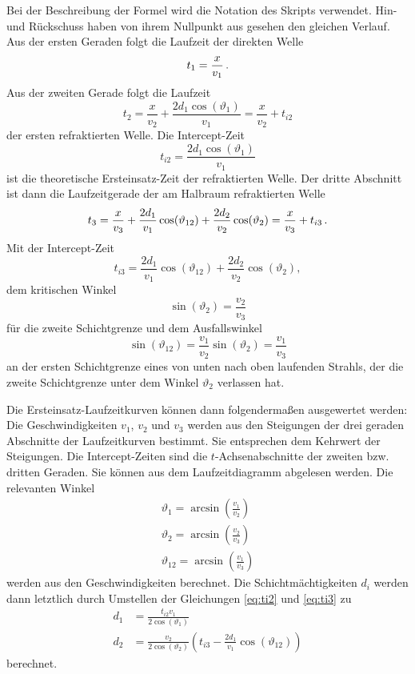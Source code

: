 Bei der Beschreibung der Formel wird die Notation des Skripts \cite{skript} verwendet. Hin- und Rückschuss haben von ihrem Nullpunkt aus gesehen den gleichen Verlauf. Aus der ersten Geraden folgt die Laufzeit der direkten Welle
\begin{equation}
 t_1=\frac{x}{v_1} \text{\,.}
\end{equation}
Aus der zweiten Gerade folgt die Laufzeit
\begin{equation}
 t_2=\frac{x}{v_2}+\frac{2d_1\cos(\vartheta_1)}{v_1}=\frac{x}{v_2}+t_{i2}
\end{equation}
der ersten refraktierten Welle. Die Intercept-Zeit
\begin{equation}
\label{eq:ti2}
 t_{i2}=\frac{2d_1\cos(\vartheta_1)}{v_1}
\end{equation}
ist die theoretische Ersteinsatz-Zeit der refraktierten Welle. Der dritte Abschnitt ist dann die Laufzeitgerade der am Halbraum refraktierten Welle
\begin{equation}
 t_3=\frac{x}{v_3}+\frac{2d_1}{v_1}\cos(\vartheta_{12})+\frac{2d_2}{v_2}\cos(\vartheta_2)=\frac{x}{v_3}+t_{i3} \text{\,.}
\end{equation}
Mit der Intercept-Zeit
\begin{equation}
\label{eq:ti3}
 t_{i3}=\frac{2d_1}{v_1}\cos(\vartheta_{12})+\frac{2d_2}{v_2}\cos(\vartheta_2)\comma
\end{equation}
dem kritischen Winkel 
\begin{equation}
 \sin(\vartheta_2)=\frac{v_2}{v_3}
\end{equation}
für die zweite Schichtgrenze und dem Ausfallswinkel
\begin{equation}
 \sin(\vartheta_{12})=\frac{v_1}{v_2}\sin(\vartheta_2)=\frac{v_1}{v_3}
\end{equation}
an der ersten Schichtgrenze eines von unten nach oben laufenden Strahls, der die zweite Schichtgrenze unter dem Winkel $\vartheta_2$ verlassen hat.

Die Ersteinsatz-Laufzeitkurven können dann folgendermaßen ausgewertet werden: Die Geschwindigkeiten $v_1$, $v_2$ und $v_3$ werden aus den Steigungen der drei geraden Abschnitte der Laufzeitkurven bestimmt. Sie entsprechen dem Kehrwert der Steigungen. Die Intercept-Zeiten sind die $t$-Achsenabschnitte der zweiten bzw. dritten Geraden. Sie können aus dem Laufzeitdiagramm abgelesen werden. Die relevanten Winkel
\begin{align}
 \vartheta_1=\arcsin\left(\frac{v_1}{v_2}\right) \\
 \vartheta_2=\arcsin\left(\frac{v_2}{v_3}\right) \\
 \vartheta_{12}=\arcsin\left(\frac{v_1}{v_3}\right)
\end{align}
werden aus den Geschwindigkeiten berechnet. Die Schichtmächtigkeiten $d_i$ werden dann letztlich durch Umstellen der Gleichungen \eqref{eq:ti2} und \eqref{eq:ti3} zu
\begin{align}
 d_1&=\frac{t_{i2}v_1}{2\cos(\vartheta_1)} \\
 d_2&=\frac{v_2}{2\cos(\vartheta_2)}\left(t_{i3}-\frac{2d_1}{v_1}\cos(\vartheta_{12})\right)
\end{align}
berechnet.


